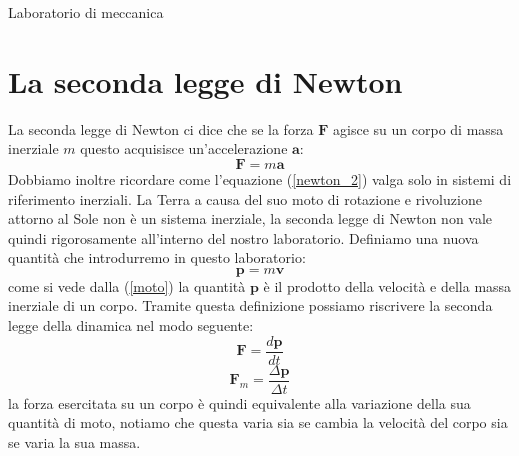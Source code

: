 \documentclass[a4paper,10pt,oneside]{article}
\begin{document}
\begin{center}
{\huge Laboratorio di meccanica}
\end{center} 



\section{La seconda legge di Newton}


La seconda legge di Newton ci dice che se la forza $\mathbf{F}$ agisce su un corpo di massa inerziale $m$ questo acquisisce un'accelerazione $\mathbf{a}$:
\begin{equation}\label{newton_2}
 \mathbf{F}=m\mathbf{a}
\end{equation}
Dobbiamo inoltre ricordare come l'equazione (\ref{newton_2}) valga solo in sistemi di riferimento inerziali. La Terra a causa del suo moto di rotazione e rivoluzione attorno al Sole non è un sistema inerziale, la seconda legge di Newton non vale quindi rigorosamente all'interno del nostro laboratorio. Definiamo una nuova quantità che introdurremo in questo laboratorio:
\begin{equation}\label{moto}
 \mathbf{p}=m\mathbf{v}
\end{equation}
come si vede dalla (\ref{moto}) la quantità $\mathbf{p}$ è il prodotto della velocità e della massa inerziale di un corpo. Tramite questa definizione possiamo riscrivere la seconda legge della dinamica nel modo seguente:
\begin{equation}
 \mathbf{F}=\frac{d\mathbf{p}}{dt}
\end{equation}
\begin{equation}
 \mathbf{F}_m=\frac{\Delta \mathbf{p}}{\Delta t}
\end{equation}
la forza esercitata su un corpo è quindi equivalente alla variazione della sua quantità di moto, notiamo che questa varia sia se cambia la velocità del corpo sia se varia la sua massa.
\end{document}
